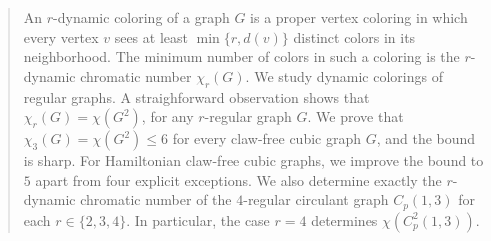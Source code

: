 \begin{abstract}
An $r$-dynamic coloring of a graph $G$ is a proper vertex coloring in
which every vertex $v$ sees at least $\min\{r,d(v)\}$ distinct colors
in its neighborhood. 
The minimum number of colors in such a
coloring is the $r$-dynamic chromatic number $\chi_r(G)$.
We study dynamic colorings of regular graphs. A straighforward observation shows that  $\chi_r(G)=\chi(G^2)$, for any $r$-regular graph $G$.
We prove that
$
\chi_3(G)=\chi(G^2)\le6
$
for every claw-free cubic graph $G$, and the bound is sharp.
For Hamiltonian claw-free cubic graphs, we improve the bound to $5$
apart from four explicit exceptions.
We also determine exactly the $r$-dynamic chromatic number of the
$4$-regular circulant graph $C_p(1,3)$ for each
$r\in\{2,3,4\}$. In particular, the case $r=4$ determines
$\chi(C^2_p(1,3))$.
\end{abstract}